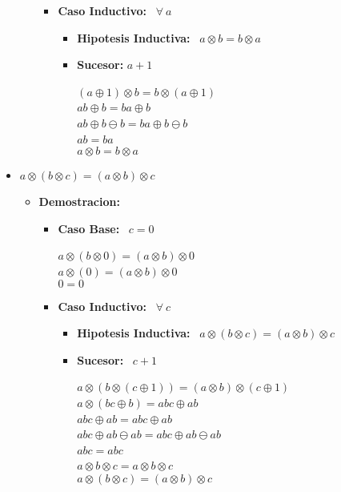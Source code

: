 \documentclass[10pt,a4paper]{article}
\begin{document}
\begin{itemize}
\begin{itemize}
\begin{itemize}
\begin{center}
        \end{center}
         \item \textbf{Caso Inductivo: } \ $ \forall\ a $
         \begin{itemize}
        \item \textbf{Hipotesis Inductiva: } \ $ a\otimes b = b\otimes a$
        \item \textbf{Sucesor: }$ a+1$
        \begin{center}
        $  (a\oplus 1)\otimes b = b\otimes (a\oplus1)$
        \
        \\ $ ab \oplus b = ba \oplus b$
        \
        \\ $ ab \oplus b \ominus b= ba \oplus b\ominus b $
        \
        \\ $ ab = ba $
        \
        \\ $ a\otimes b = b\otimes a $
        \end{center}
         \end{itemize}
        \end{itemize}
        \end{itemize}
        \item{$a \otimes (b \otimes c)=(a\otimes b)\otimes c$} 
        \begin{itemize}
        \item \textbf{Demostracion: }
		\begin{itemize}
		\item \textbf{Caso Base:} \ $ c = 0 $
		\begin{center}
		$ a \otimes (b \otimes 0)=(a\otimes b)\otimes 0$
		\
		\\ $ a\otimes (0) =(a\otimes b)\otimes 0 $
		\
		\\ $ 0 = 0 $
	
		\end{center}
		\item \textbf{Caso Inductivo: } \ $\forall\ c $
		\begin{itemize}
		\item \textbf{Hipotesis Inductiva: } \ $ a \otimes (b \otimes c)=(a\otimes b)\otimes c$
		\item \textbf{Sucesor: } \ $ c+1$
		\begin{center}
		$a \otimes (b \otimes (c\oplus 1))=(a\otimes b)\otimes (c\oplus 1)$
		\
		\\$ a\otimes(bc\oplus b) = abc\oplus ab$
		\
		\\$ abc\oplus ab = abc\oplus ab $
		\
		\\ $ abc\oplus ab\ominus ab = abc\oplus ab\ominus ab $
		\
		\\$ abc = abc $
		\
		\\ $ a\otimes b\otimes c= a\otimes b\otimes c $
		\
		\\ $ a \otimes (b \otimes c)=(a\otimes b)\otimes c$
		\end{center}
		\end{itemize}
		\end{itemize}
\end{itemize}               
       

\end{itemize}
\end{document}

